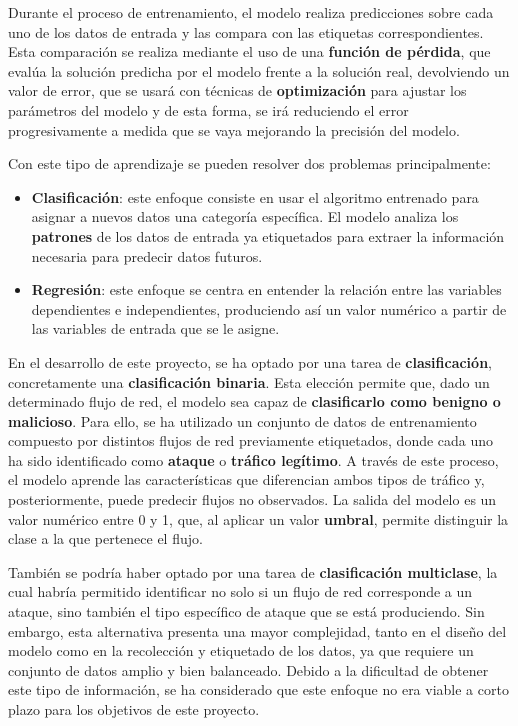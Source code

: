 Durante el proceso de entrenamiento, el modelo realiza predicciones sobre cada uno de los datos de entrada y las compara con las etiquetas correspondientes. Esta comparación se realiza mediante el uso de una \textbf{función de pérdida}, que evalúa la solución predicha por el modelo frente a la solución real, devolviendo un valor de error, que se usará con técnicas de \textbf{optimización} para ajustar los parámetros del modelo y de esta forma, se irá reduciendo el error progresivamente a medida que se vaya mejorando la precisión del modelo.

Con este tipo de aprendizaje se pueden resolver dos problemas principalmente:
\begin{itemize}
    \item \textbf{Clasificación}: este enfoque consiste en usar el algoritmo entrenado para asignar a nuevos datos una categoría específica. El modelo analiza los \textbf{patrones} de los datos de entrada ya etiquetados para extraer la información necesaria para predecir datos futuros.
    \item \textbf{Regresión}: este enfoque se centra en entender la relación entre las variables dependientes e independientes, produciendo así un valor numérico a partir de las variables de entrada que se le asigne. 
\end{itemize}

En el desarrollo de este proyecto, se ha optado por una tarea de \textbf{clasificación}, concretamente una \textbf{clasificación binaria}. Esta elección permite que, dado un determinado flujo de red, el modelo sea capaz de \textbf{clasificarlo como benigno o malicioso}. Para ello, se ha utilizado un conjunto de datos de entrenamiento compuesto por distintos flujos de red previamente etiquetados, donde cada uno ha sido identificado como \textbf{ataque} o \textbf{tráfico legítimo}. A través de este proceso, el modelo aprende las características que diferencian ambos tipos de tráfico y, posteriormente, puede predecir flujos no observados. La salida del modelo es un valor numérico entre 0 y 1, que, al aplicar un valor \textbf{umbral}, permite distinguir la clase a la que pertenece el flujo.

También se podría haber optado por una tarea de \textbf{clasificación multiclase}, la cual habría permitido identificar no solo si un flujo de red corresponde a un ataque, sino también el tipo específico de ataque que se está produciendo. Sin embargo, esta alternativa presenta una mayor complejidad, tanto en el diseño del modelo como en la recolección y etiquetado de los datos, ya que requiere un conjunto de datos amplio y bien balanceado. Debido a la dificultad de obtener este tipo de información, se ha considerado que este enfoque no era viable a corto plazo para los objetivos de este proyecto.

